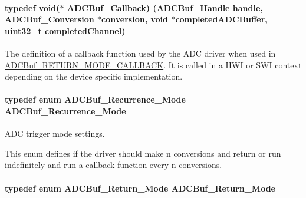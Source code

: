 \paragraph[{A\+D\+C\+Buf\+\_\+\+Callback}]{\setlength{\rightskip}{0pt plus 5cm}typedef void($\ast$ A\+D\+C\+Buf\+\_\+\+Callback) ({\bf A\+D\+C\+Buf\+\_\+\+Handle} handle, {\bf A\+D\+C\+Buf\+\_\+\+Conversion} $\ast$conversion, void $\ast$completed\+A\+D\+C\+Buffer, uint32\+\_\+t completed\+Channel)}\label{_a_d_c_buf_8h_a477c377c65f8de04aa67ff7eefa0a4cf}


The definition of a callback function used by the A\+D\+C driver when used in \hyperlink{_a_d_c_buf_8h_a3d643e8024503c5ef2679c83419ba6eea633b4b063b88d7c62e9e2513075a36a7}{A\+D\+C\+Buf\+\_\+\+R\+E\+T\+U\+R\+N\+\_\+\+M\+O\+D\+E\+\_\+\+C\+A\+L\+L\+B\+A\+C\+K}. It is called in a H\+W\+I or S\+W\+I context depending on the device specific implementation. 

\paragraph[{A\+D\+C\+Buf\+\_\+\+Recurrence\+\_\+\+Mode}]{\setlength{\rightskip}{0pt plus 5cm}typedef enum {\bf A\+D\+C\+Buf\+\_\+\+Recurrence\+\_\+\+Mode}  {\bf A\+D\+C\+Buf\+\_\+\+Recurrence\+\_\+\+Mode}}\label{_a_d_c_buf_8h_a56e923d70f15e00c78a7c730d7112e4d}


A\+D\+C trigger mode settings. 

This enum defines if the driver should make n conversions and return or run indefinitely and run a callback function every n conversions. 
\paragraph[{A\+D\+C\+Buf\+\_\+\+Return\+\_\+\+Mode}]{\setlength{\rightskip}{0pt plus 5cm}typedef enum {\bf A\+D\+C\+Buf\+\_\+\+Return\+\_\+\+Mode}  {\bf A\+D\+C\+Buf\+\_\+\+Return\+\_\+\+Mode}}\label{_a_d_c_buf_8h_a12018234e9f4c347c3416592cdb113ef}



